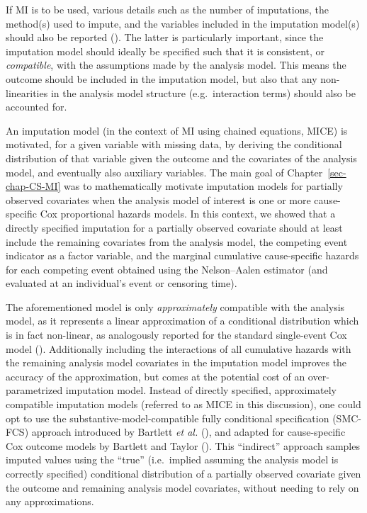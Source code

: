\documentclass[
  letterpaper,
  DIV=11,
  numbers=noendperiod]{scrreprt}
\begin{document}
If MI is to be used, various details such as the number of imputations,
the method(s) used to impute, and the variables included in the
imputation model(s) should also be reported
(). The latter is particularly important, since the imputation
model should ideally be specified such that it is consistent, or
\emph{compatible}, with the assumptions made by the analysis model. This
means the outcome should be included in the imputation model, but also
that any non-linearities in the analysis model structure
(e.g.~interaction terms) should also be accounted for.

An imputation model (in the context of MI using chained equations, MICE)
is motivated, for a given variable with missing data, by deriving the
conditional distribution of that variable given the outcome and the
covariates of the analysis model, and eventually also auxiliary
variables. The main goal of Chapter~\ref{sec-chap-CS-MI} was to
mathematically motivate imputation models for partially observed
covariates when the analysis model of interest is one or more
cause-specific Cox proportional hazards models. In this context, we
showed that a directly specified imputation for a partially observed
covariate should at least include the remaining covariates from the
analysis model, the competing event indicator as a factor variable, and
the marginal cumulative cause-specific hazards for each competing event
obtained using the Nelson--Aalen estimator (and evaluated at an
individual's event or censoring time).

The aforementioned model is only \emph{approximately} compatible with
the analysis model, as it represents a linear approximation of a
conditional distribution which is in fact non-linear, as analogously
reported for the standard single-event Cox model
(). Additionally including the interactions of all cumulative
hazards with the remaining analysis model covariates in the imputation
model improves the accuracy of the approximation, but comes at the
potential cost of an over-parametrized imputation model. Instead of
directly specified, approximately compatible imputation models (referred
to as MICE in this discussion), one could opt to use the
substantive-model-compatible fully conditional specification (SMC-FCS)
approach introduced by Bartlett \emph{et al.}
(), and
adapted for cause-specific Cox outcome models by Bartlett and Taylor
(). This
``indirect'' approach samples imputed values using the ``true''
(i.e.~implied assuming the analysis model is correctly specified)
conditional distribution of a partially observed covariate given the
outcome and remaining analysis model covariates, without needing to rely
on any approximations.
\end{document}
